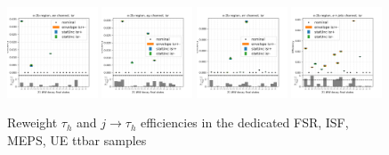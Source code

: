 \begin{figure}
    \includegraphics[width=0.24\textwidth]{chapters/Appendix/sectionTTSyst/figures/afterCorr/icata3_ch0_isr.png}
    \includegraphics[width=0.24\textwidth]{chapters/Appendix/sectionTTSyst/figures/afterCorr/icata3_ch1_isr.png}
    \includegraphics[width=0.24\textwidth]{chapters/Appendix/sectionTTSyst/figures/afterCorr/icata3_ch2_isr.png}
    \includegraphics[width=0.24\textwidth]{chapters/Appendix/sectionTTSyst/figures/afterCorr/icata3_ch3_isr.png}
    
    \caption{Reweight $\tau_h$ and $j \to \tau_h$ efficiencies in the dedicated FSR, ISF, MEPS, UE ttbar samples}
    \label{fig:appendix:reweighttt:effAfterCorrFSR}
\end{figure}




